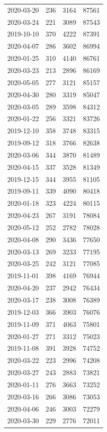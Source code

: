 \begin{tabular}{lrrr}
2020-03-20 & 236 & 3164 & 87561 \\
2020-03-24 & 221 & 3089 & 87543 \\
2019-10-10 & 370 & 4222 & 87391 \\
2020-04-07 & 286 & 3602 & 86994 \\
2020-01-25 & 310 & 4140 & 86761 \\
2020-03-23 & 213 & 2896 & 86169 \\
2020-05-05 & 277 & 3121 & 85157 \\
2020-04-30 & 280 & 3319 & 85047 \\
2020-03-05 & 289 & 3598 & 84312 \\
2020-01-22 & 256 & 3321 & 83726 \\
2019-12-10 & 358 & 3748 & 83315 \\
2019-09-12 & 318 & 3766 & 82638 \\
2020-03-06 & 344 & 3870 & 81489 \\
2020-04-15 & 337 & 3528 & 81349 \\
2019-12-15 & 344 & 3955 & 81105 \\
2019-09-11 & 339 & 4090 & 80418 \\
2020-01-18 & 323 & 4224 & 80115 \\
2020-04-23 & 267 & 3191 & 78084 \\
2020-05-12 & 252 & 2782 & 78028 \\
2020-04-08 & 290 & 3436 & 77650 \\
2020-03-13 & 269 & 3233 & 77195 \\
2020-03-25 & 242 & 3121 & 77085 \\
2019-11-01 & 398 & 4169 & 76944 \\
2020-04-20 & 237 & 2942 & 76434 \\
2020-03-17 & 238 & 3008 & 76389 \\
2019-12-03 & 366 & 3903 & 76076 \\
2019-11-09 & 371 & 4063 & 75801 \\
2020-01-27 & 271 & 3312 & 75023 \\
2019-11-08 & 391 & 3928 & 74752 \\
2020-03-22 & 223 & 2996 & 74208 \\
2020-03-27 & 243 & 2883 & 73821 \\
2020-01-11 & 276 & 3663 & 73252 \\
2020-03-16 & 266 & 3086 & 73053 \\
2020-04-06 & 246 & 3003 & 72279 \\
2020-03-30 & 229 & 2776 & 72011 \\

\end{tabular}
